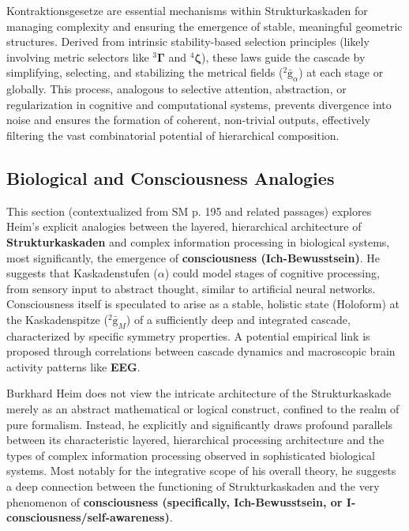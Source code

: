 \documentclass[12pt]{article}
\newcommand{\kompositionsfeld}{{}^2\bar{\mathrm{g}}}
\newcommand{\fundamentalkondensor}{{}^3\bm{\Gamma}}
\newcommand{\kaskadenstufe}{\alpha}
\newcommand{\strukturkompressor}{{}^4\bm{\zeta}}
\begin{document}
Kontraktionsgesetze are essential mechanisms within Strukturkaskaden for managing complexity and ensuring the emergence of stable, meaningful geometric structures. Derived from intrinsic stability-based selection principles (likely involving metric selectors like \(\fundamentalkondensor\) and \(\strukturkompressor\)), these laws guide the cascade by simplifying, selecting, and stabilizing the metrical fields (\(\kompositionsfeld_\alpha\)) at each stage or globally. This process, analogous to selective attention, abstraction, or regularization in cognitive and computational systems, prevents divergence into noise and ensures the formation of coherent, non-trivial outputs, effectively filtering the vast combinatorial potential of hierarchical composition.

\subsection{Biological and Consciousness Analogies}
\label{sec:cascade_cognition}

This section (contextualized from SM p. 195 and related passages) explores Heim's explicit analogies between the layered, hierarchical architecture of \textbf{Strukturkaskaden} and complex information processing in biological systems, most significantly, the emergence of \textbf{consciousness (Ich-Bewusstsein)}. He suggests that Kaskadenstufen (\(\kaskadenstufe\)) could model stages of cognitive processing, from sensory input to abstract thought, similar to artificial neural networks. Consciousness itself is speculated to arise as a stable, holistic state (Holoform) at the Kaskadenspitze (\(\kompositionsfeld_M\)) of a sufficiently deep and integrated cascade, characterized by specific symmetry properties. A potential empirical link is proposed through correlations between cascade dynamics and macroscopic brain activity patterns like \textbf{EEG}.

Burkhard Heim does not view the intricate architecture of the Strukturkaskade merely as an abstract mathematical or logical construct, confined to the realm of pure formalism. Instead, he explicitly and significantly draws profound parallels between its characteristic layered, hierarchical processing architecture and the types of complex information processing observed in sophisticated biological systems. Most notably for the integrative scope of his overall theory, he suggests a deep connection between the functioning of Strukturkaskaden and the very phenomenon of \textbf{consciousness (specifically, Ich-Bewusstsein, or I-consciousness/self-awareness)}.
\end{document}
